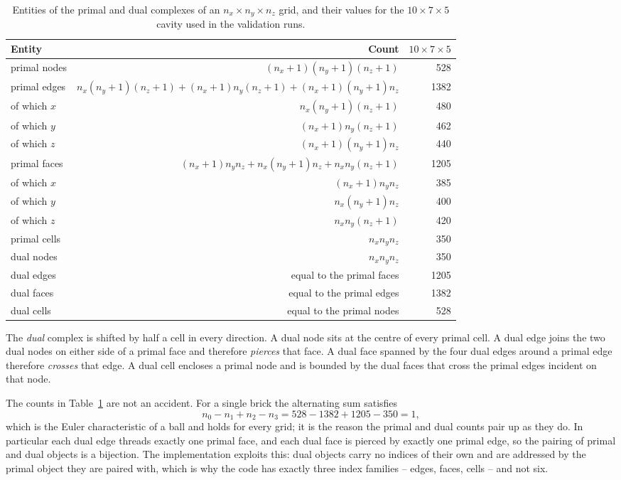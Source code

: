 \begin{table}[H]
  \centering
  \caption{Entities of the primal and dual complexes of an $n_x\times n_y\times n_z$ grid, and their values for
  the $10\times7\times5$ cavity used in the validation runs.}
  \label{tab:counts}
  \begin{tabular}{@{}lrr@{}}
    \toprule
    Entity & Count & $10\times7\times5$ \\
    \midrule
    primal nodes   & $(n_x+1)(n_y+1)(n_z+1)$ & 528  \\
    primal edges   & $n_x(n_y+1)(n_z+1) + (n_x+1)n_y(n_z+1) + (n_x+1)(n_y+1)n_z$ & 1382 \\
    \quad of which $x$ & $n_x(n_y+1)(n_z+1)$ & 480 \\
    \quad of which $y$ & $(n_x+1)n_y(n_z+1)$ & 462 \\
    \quad of which $z$ & $(n_x+1)(n_y+1)n_z$ & 440 \\
    primal faces   & $(n_x+1)n_yn_z + n_x(n_y+1)n_z + n_xn_y(n_z+1)$ & 1205 \\
    \quad of which $x$ & $(n_x+1)n_yn_z$ & 385 \\
    \quad of which $y$ & $n_x(n_y+1)n_z$ & 400 \\
    \quad of which $z$ & $n_xn_y(n_z+1)$ & 420 \\
    primal cells   & $n_xn_yn_z$ & 350 \\
    dual nodes     & $n_xn_yn_z$ & 350 \\
    dual edges     & equal to the primal faces & 1205 \\
    dual faces     & equal to the primal edges & 1382 \\
    dual cells     & equal to the primal nodes & 528 \\
    \bottomrule
  \end{tabular}
\end{table}

The \emph{dual} complex is shifted by half a cell in every direction. A dual node sits at the centre of every
primal cell. A dual edge joins the two dual nodes on either side of a primal face and therefore \emph{pierces}
that face. A dual face spanned by the four dual edges around a primal edge therefore \emph{crosses} that edge. A
dual cell encloses a primal node and is bounded by the dual faces that cross the primal edges incident on that
node.

The counts in Table~\ref{tab:counts} are not an accident. For a single brick the alternating sum satisfies
\begin{equation}
  n_0 - n_1 + n_2 - n_3 = 528 - 1382 + 1205 - 350 = 1,
  \label{eq:euler}
\end{equation}
which is the Euler characteristic of a ball and holds for every grid; it is the reason the primal and dual counts
pair up as they do. In particular each dual edge threads exactly one primal face, and each dual face is pierced by
exactly one primal edge, so the pairing of primal and dual objects is a bijection. The implementation exploits
this: dual objects carry no indices of their own and are addressed by the primal object they are paired with,
which is why the code has exactly three index families -- edges, faces, cells -- and not six.

